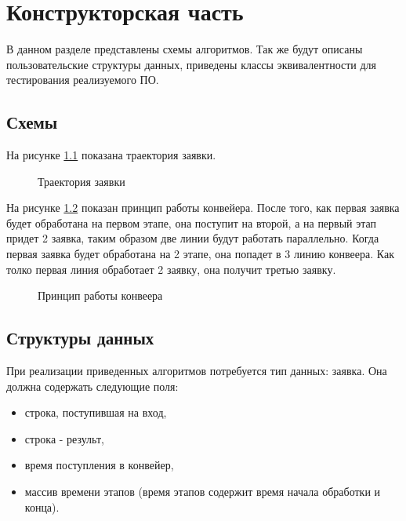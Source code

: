 
\chapter{Конструкторская часть}\label{Konstruct}

В данном разделе представлены схемы алгоритмов. Так же будут описаны пользовательские структуры данных, 
приведены классы эквивалентности для тестирования реализуемого ПО.

\section{Схемы}\label{SchemaAlg}

На рисунке \ref{ris:schemaposav} показана траектория заявки.

\begin{figure}[H]
  \caption{Траектория заявки}
  \label{ris:schemaposav}
\end{figure}

На рисунке \ref{ris:schemaparrowav} показан принцип работы конвейера. После того, как первая заявка будет обработана на первом этапе,
она поступит на второй, а на первый этап придет 2 заявка, таким образом две линии будут работать параллельно. Когда первая заявка 
будет обработана на 2 этапе, она попадет в 3 линию конвеера. Как толко первая линия обработает 2 заявку, она получит третью заявку.

\begin{figure}[H]
  \caption{Принцип работы конвеера}
  \label{ris:schemaparrowav}
\end{figure}


\section{Структуры данных}\label{Structs}

При реализации приведенных алгоритмов потребуется тип данных: заявка.
Она должна содержать следующие поля:

\begin{itemize}
  \item строка, поступившая на вход,
  \item строка - результ,
  \item время поступления в конвейер,
  \item массив времени этапов (время этапов содержит время начала обработки и конца).
\end{itemize}

